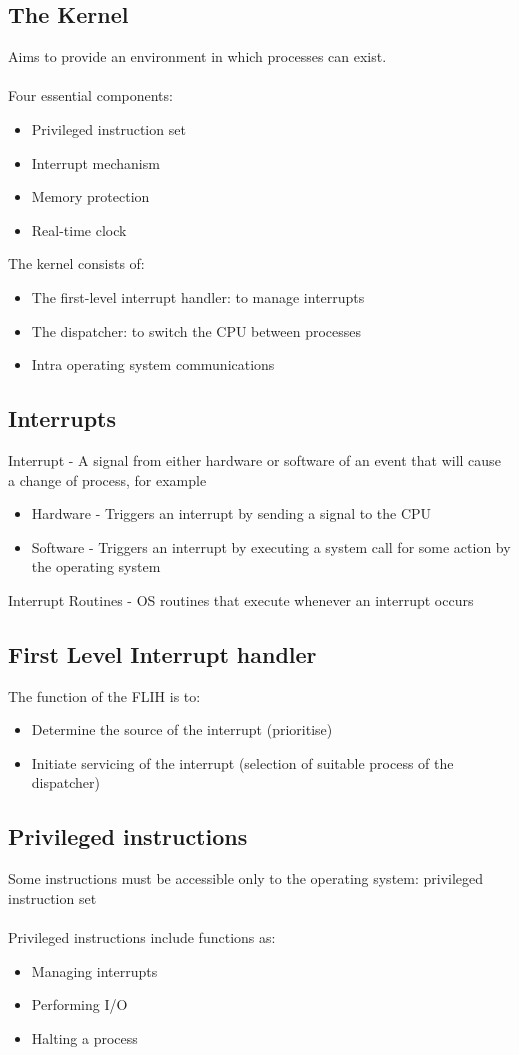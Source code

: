 \documentclass{article}[18pt]
\begin{document}
\subsection{The Kernel}
Aims to provide an environment in which processes can exist.\\
\\
Four essential components:
\begin{itemize}
	\item Privileged instruction set
	\item Interrupt mechanism
	\item Memory protection
	\item Real-time clock
\end{itemize}
The kernel consists of:
\begin{itemize}
	\item The first-level interrupt handler: to manage interrupts
	\item The dispatcher: to switch the CPU between processes
	\item Intra operating system communications
\end{itemize}
\subsection{Interrupts}
Interrupt - A signal from either hardware or software of an event that will cause a change of process, for example
\begin{itemize}
	\item Hardware - Triggers an interrupt by sending a signal to the CPU 
	\item Software - Triggers an interrupt by executing a system call for some action by the operating system
\end{itemize}
Interrupt Routines - OS routines that execute whenever an interrupt occurs
\subsection{First Level Interrupt handler}
The function of the FLIH is to:
\begin{itemize}
	\item Determine the source of the interrupt (prioritise)
	\item Initiate servicing of the interrupt (selection of suitable process of the dispatcher)
\end{itemize}
\subsection{Privileged instructions}
Some instructions must be accessible only to the operating system: privileged instruction set\\
\\
Privileged instructions include functions as:
\begin{itemize}
	\item Managing interrupts
	\item Performing I/O
	\item Halting a process
\end{itemize}
\end{document}
